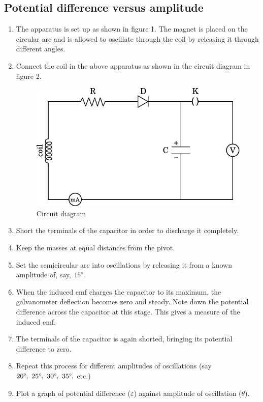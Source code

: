 \documentclass[12pt,a4paper]{article}
\begin{document}
		\subsection{Potential difference versus amplitude}
		
		\begin{enumerate}
			\item The apparatus is set up as shown in figure 1. The magnet is placed on the circular arc and is allowed to oscillate through the coil by releasing it through different angles.
			
			\item Connect the coil in the above apparatus as shown in the circuit diagram in figure 2.
			
			\begin{figure}[!htb]
				\centering
				\includegraphics[scale=1]{emf-circuit.pdf}
				\caption{Circuit diagram}
			\end{figure}
			
			\item Short the terminals of the capacitor in order to discharge it completely. 
			
			\item Keep the masses at equal distances from the pivot.
			
			\item Set the semicircular arc into oscillations by releasing it from a known amplitude of, say, $15\degree$.
			
			\item When the induced emf charges the capacitor to its maximum, the galvanometer deflection becomes zero and steady. Note down the potential difference across the capacitor at this stage. This gives a measure of the induced emf.
			
			\item The terminals of the capacitor is again shorted, bringing its potential difference to zero.
			
			\item Repeat this process for different amplitudes of oscillations (say $20\degree,\ 25\degree,\ 30\degree,\ 35\degree,\ $etc.)
			
			\item Plot a graph of potential difference ($\varepsilon$) against amplitude of oscillation ($\theta$).
		\end{enumerate}
		
\end{document}
